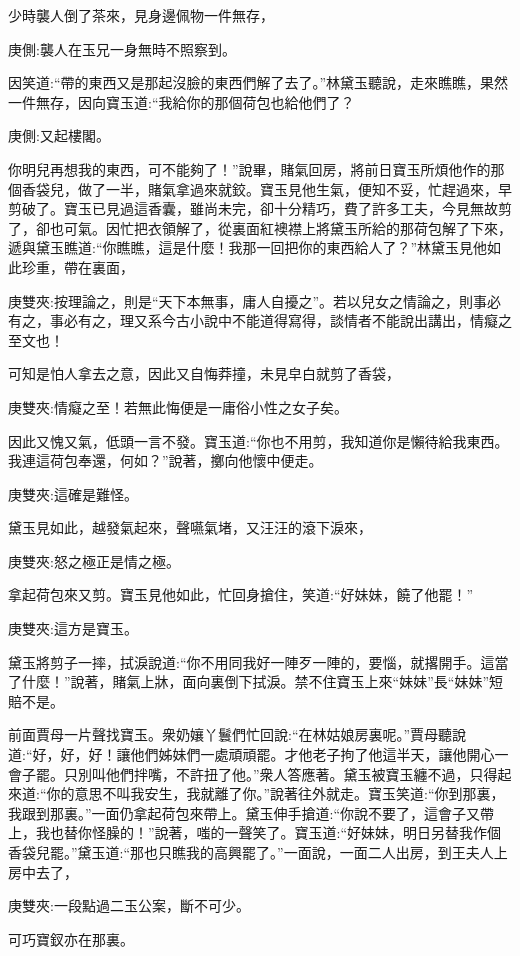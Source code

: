 \begin{parag}
    少時襲人倒了茶來，見身邊佩物一件無存，\begin{note}庚側:襲人在玉兄一身無時不照察到。\end{note}因笑道:“帶的東西又是那起沒臉的東西們解了去了。”林黛玉聽說，走來瞧瞧，果然一件無存，因向寶玉道:“我給你的那個荷包也給他們了？\begin{note}庚側:又起樓閣。\end{note}你明兒再想我的東西，可不能夠了！”說畢，賭氣回房，將前日寶玉所煩他作的那個香袋兒，做了一半，賭氣拿過來就鉸。寶玉見他生氣，便知不妥，忙趕過來，早剪破了。寶玉已見過這香囊，雖尚未完，卻十分精巧，費了許多工夫，今見無故剪了，卻也可氣。因忙把衣領解了，從裏面紅襖襟上將黛玉所給的那荷包解了下來，遞與黛玉瞧道:“你瞧瞧，這是什麼！我那一回把你的東西給人了？”林黛玉見他如此珍重，帶在裏面，\begin{note}庚雙夾:按理論之，則是“天下本無事，庸人自擾之”。若以兒女之情論之，則事必有之，事必有之，理又系今古小說中不能道得寫得，談情者不能說出講出，情癡之至文也！\end{note}可知是怕人拿去之意，因此又自悔莽撞，未見皁白就剪了香袋，\begin{note}庚雙夾:情癡之至！若無此悔便是一庸俗小性之女子矣。\end{note}因此又愧又氣，低頭一言不發。寶玉道:“你也不用剪，我知道你是懶待給我東西。我連這荷包奉還，何如？”說著，擲向他懷中便走。\begin{note}庚雙夾:這確是難怪。\end{note}黛玉見如此，越發氣起來，聲嚥氣堵，又汪汪的滾下淚來，\begin{note}庚雙夾:怒之極正是情之極。\end{note}拿起荷包來又剪。寶玉見他如此，忙回身搶住，笑道:“好妹妹，饒了他罷！”\begin{note}庚雙夾:這方是寶玉。\end{note}黛玉將剪子一摔，拭淚說道:“你不用同我好一陣歹一陣的，要惱，就撂開手。這當了什麼！”說著，賭氣上牀，面向裏倒下拭淚。禁不住寶玉上來“妹妹”長“妹妹”短賠不是。
\end{parag}


\begin{parag}
    前面賈母一片聲找寶玉。衆奶孃丫鬟們忙回說:“在林姑娘房裏呢。”賈母聽說道:“好，好，好！讓他們姊妹們一處頑頑罷。才他老子拘了他這半天，讓他開心一會子罷。只別叫他們拌嘴，不許扭了他。”衆人答應著。黛玉被寶玉纏不過，只得起來道:“你的意思不叫我安生，我就離了你。”說著往外就走。寶玉笑道:“你到那裏，我跟到那裏。”一面仍拿起荷包來帶上。黛玉伸手搶道:“你說不要了，這會子又帶上，我也替你怪臊的！”說著，嗤的一聲笑了。寶玉道:“好妹妹，明日另替我作個香袋兒罷。”黛玉道:“那也只瞧我的高興罷了。”一面說，一面二人出房，到王夫人上房中去了，\begin{note}庚雙夾:一段點過二玉公案，斷不可少。\end{note}可巧寶釵亦在那裏。
\end{parag}


